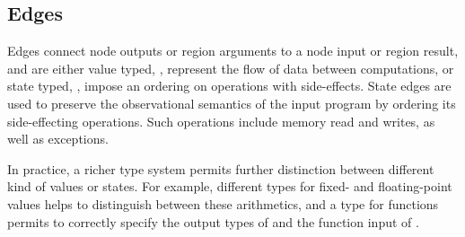 \subsection{Edges}\label{sec:edges}
Edges connect node outputs or region arguments to a node input or region result, and are either
value typed, \ie, represent the flow of data between computations, or state typed, \ie,
impose an ordering on operations with side-effects. State edges are used to preserve
the observational semantics of the input program by ordering its side-effecting operations. Such
operations include memory read and writes, as well as exceptions.

In practice, a richer type system permits further distinction between different kind of values or
states. For example, different types for fixed- and floating-point values helps to distinguish
between these arithmetics, and a type for functions permits to correctly specify the
output types of \lambdanodes and the function input of \applynodes.


